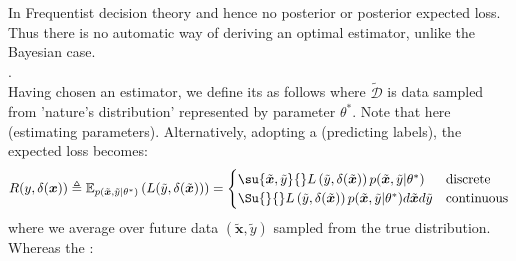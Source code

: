 In Frequentist decision theory  and hence no posterior or posterior expected loss. Thus there is no 
automatic way of deriving an optimal estimator, unlike the Bayesian case.\\
.\\
Having chosen an estimator, we define its  as follows
where $\tilde{\mathcal{D}}$ is data sampled from 'nature's distribution' represented by
parameter $\theta^{*}$. Note that here 
(estimating parameters).
Alternatively, adopting a  (predicting labels), the
expected loss becomes:
$$ R(y, \delta(\bm{x})) \triangleq \mathbb{E}_{p(\tilde{\bm{x}}, \tilde{y}|\theta^{*})}
\left(L(\tilde{y}, \delta(\tilde{\bm{x}}))\right) =
\begin{cases}
    \su{\tilde{\bm{x}}, \tilde{y}}{}L\left(\tilde{y}, \delta(\tilde{\bm{x}})\right)p(\tilde{\bm{x}}, \tilde{y}|\theta^{*}) & \text{discrete} \\
    \Su{}{}L\left(\tilde{y}, \delta(\tilde{\bm{x}})\right)p(\tilde{\bm{x}}, \tilde{y}|\theta^{*})d\tilde{\bm{x}}d\tilde{y} & \text{continuous}
\end{cases}
$$
where we average over future data $(\tilde{\bm{x}}, \tilde{y})$ sampled from the true distribution.\\
Whereas the :

